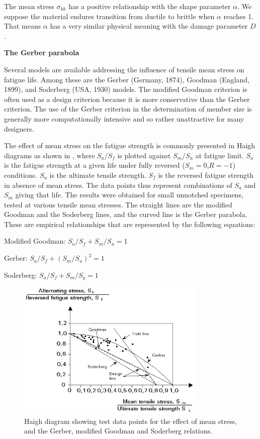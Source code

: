 The mean stress $\sigma_{kk}$ has a positive relationship with the shape parameter $\alpha$. We suppose the material endures transition from ductile to brittle when $\alpha$ reaches 1. That means $\alpha$ has a very similar physical meaning with the damage parameter $D$.

\vspace{6pt}
\textbf{The Gerber parabola}
\vspace{6pt}

Several models are available addressing the influence of tensile mean stress on fatigue life. Among these are the Gerber (Germany, 1874), Goodman (England, 1899), and Soderberg (USA, 1930) models.  The modified Goodman criterion is often used as a design criterion because it is more conservative than the Gerber criterion. The use of the Gerber criterion in the determination of member size is generally more computationally  intensive and so rather unattractive for many designers.

The effect of mean stress on the fatigue strength is commonly presented in Haigh diagrams as shown in , where $S_a / S_f$ is plotted against $S_m / S_u$ at fatigue limit. $S_a$ is the fatigue strength at a given life under fully reversed ($S_m = 0$,$R = -1$) conditions. $S_u$ is the ultimate tensile strength. $S_f$ is the reversed fatigue strength in absence of mean stress. The data points thus represent combinations of $S_a$ and $S_m$ giving that life. The results were obtained for small unnotched specimens, tested at various tensile mean stresses. The straight lines are the modified Goodman and the Soderberg lines, and the curved line is the Gerber parabola. These are empirical relationships that are represented by the following equations:

\vspace{6pt}
Modified Goodman: $S_a/S_f + S_m/S_u = 1$

\vspace{6pt}
Gerber: $S_a/ S_f + (S_m/ S_u)^2 = 1$

\vspace{6pt}
Soderberg: $S_a/S_f+S_m/S_y=1$

\begin{figure}[h!]
	\centering
	\includegraphics[width=0.8\textwidth]{figures//Gerber.png} 
	\caption{Haigh diagram showing test data points for the effect of mean stress, and the Gerber, modified Goodman and Soderberg relations.}
	\label{haigh}
\end{figure}


